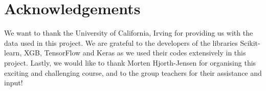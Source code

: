 \documentclass[a4paper, 11pt, twocolumn]{article}
\begin{document}
\section*{Acknowledgements}
We want to thank the University of California, Irving for providing us with the
data used in this project. We are grateful to the developers of the libraries Scikit-learn, XGB, TensorFlow 
and Keras as we used their codes extensively in this project.
Lastly, we would like to thank Morten Hjorth-Jensen for organising this exciting 
and challenging course, and to the group teachers for their assistance and input!
%

\end{document}
